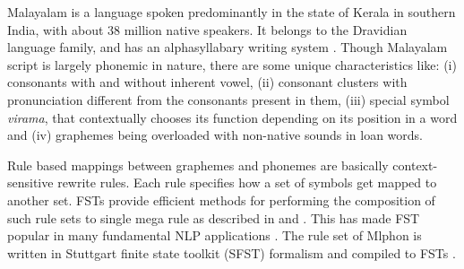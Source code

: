 \documentclass{ieeeaccess}
\begin{document}


Malayalam is a language spoken predominantly in the state of Kerala in southern India, with about 38 million native speakers. It belongs to the Dravidian language family, and has an alphasyllabary writing system \cite{bri1999typology}. Though Malayalam script is largely phonemic in nature, there are some unique characteristics like: (i) consonants with and without inherent vowel, (ii) consonant clusters with pronunciation different from the consonants present in them, (iii) special symbol \textit{virama}, that contextually chooses its function depending on its position in a word and (iv) graphemes being overloaded with non-native sounds in loan words. %

Rule based mappings between graphemes and phonemes are basically context-sensitive rewrite rules. Each rule specifies how a set of symbols get mapped to another set. FSTs provide efficient methods for performing the composition of such rule sets to single mega rule as described in \cite{kaplan1994regular} and \cite{karttunen1992two}. This has made FST popular in many fundamental NLP applications \cite{oflazer2006architecture,anberbir2011grapheme, mortensen2018epitran,thottingal-2019-finite,kayabacs2019trmor}. The rule set of Mlphon is written in Stuttgart finite state toolkit (SFST) formalism and compiled to FSTs \cite{schmid2005programming}. 
\end{document}
